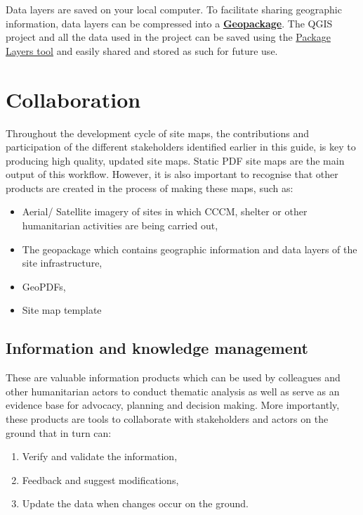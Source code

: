 \documentclass[
  a4paper,
  onecolumn,
  oneside]{book}
\providecommand{\tightlist}{%
  \setlength{\itemsep}{0pt}\setlength{\parskip}{0pt}}\usepackage{longtable,booktabs,array}
\begin{document}
Data layers are saved on your local computer. To facilitate sharing
geographic information, data layers can be compressed into a
\href{https://docs.qgis.org/3.22/en/docs/user_manual/managing_data_source/supported_data.html?highlight=fields\%20attributes\#geopackage}{\textbf{Geopackage}}.
The QGIS project and all the data used in the project can be saved using
the
\href{https://www.cadlinecommunity.co.uk/hc/en-us/articles/4403555255697-QGIS-Package-Layers}{Package
Layers tool} and easily shared and stored as such for future use.

\hypertarget{collaboration}{%
\chapter{Collaboration}\label{collaboration}}

Throughout the development cycle of site maps, the contributions and
participation of the different stakeholders identified earlier in this
guide, is key to producing high quality, updated site maps. Static PDF
site maps are the main output of this workflow. However, it is also
important to recognise that other products are created in the process of
making these maps, such as:

\begin{itemize}
\tightlist
\item
  Aerial/ Satellite imagery of sites in which CCCM, shelter or other
  humanitarian activities are being carried out,
\item
  The geopackage which contains geographic information and data layers
  of the site infrastructure,
\item
  GeoPDFs,
\item
  Site map template
\end{itemize}

\hypertarget{information-and-knowledge-management}{%
\section{Information and knowledge
management}\label{information-and-knowledge-management}}

These are valuable information products which can be used by colleagues
and other humanitarian actors to conduct thematic analysis as well as
serve as an evidence base for advocacy, planning and decision making.
More importantly, these products are tools to collaborate with
stakeholders and actors on the ground that in turn can:

\begin{enumerate}
\def\labelenumi{\arabic{enumi}.}
\tightlist
\item
  Verify and validate the information,
\item
  Feedback and suggest modifications,
\item
  Update the data when changes occur on the ground.
\end{enumerate}
\end{document}
